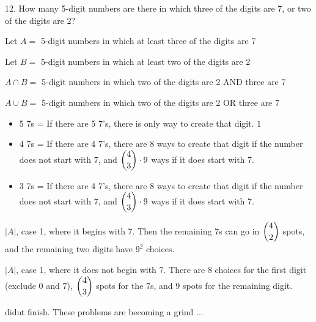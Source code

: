 \documentclass[openany, 11pt]{book}
\begin{document}
\begin{exercise}{}{}
	12. How many 5-digit numbers are there in which three of the
	digits are 7, or two of the digits are 2?
	\begin{alist}
		\item Let $A=$ 5-digit numbers in which at least three of the digits are 7
		\item Let $B=$ 5-digit numbers in which at least two of the digits are 2
		\item $A\cap B= $ 5-digit numbers in which two of the digits are 2 AND three are 7
		\item $A\cup B= $ 5-digit numbers in which two of the digits are 2 OR three are 7

		\begin{itemize}
			\item 5 7s = If there are 5 7's, there is only way to create that digit. $1$
			\item 4 7s = If there are 4 7's, there are 8 ways to create that digit if
			      the number does not start with 7, and $\dbinom{4}{3}\cdot9$ ways if it
			      does start with 7.
			\item 3 7s = If there are 4 7's, there are 8 ways to create that digit if
			      the number does not start with 7, and $\dbinom{4}{3}\cdot9$ ways if it
			      does start with 7.
		\end{itemize}

		\item $|A|$, case 1, where it begins with 7. Then the remaining 7s can go in
		$\dbinom{4}{2}$ spots, and the remaining two digits have $9^2$ choices.
		\item $|A|$, case 1, where it does not begin with 7. There are 8 choices for the
		first digit (exclude 0 and 7), $\dbinom{4}{3}$ spots for the 7s, and 9 spots
		for the remaining digit.

		\item didnt finish. These problems are becoming a grind ...
	\end{alist}
\end{exercise}

\end{document}
